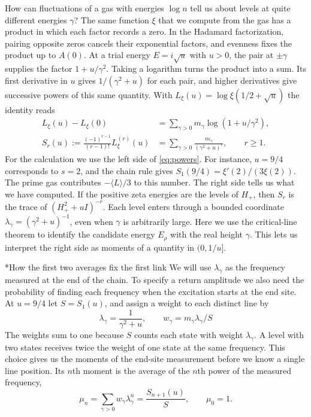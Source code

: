 \documentclass[11pt,letterpaper]{article}
\makeatletter
\renewcommand\subsection{\@startsection{subsection}{2}{\z@}{-2.0ex plus -.3ex}{.75ex}{\normalfont\normalsize\itshape}}
\numberwithin{equation}{section}
\makeatother
\begin{document}
How can fluctuations of a gas with energies $\log n$ tell us about levels at quite different energies $\gamma$? The same function $\xi$ that we compute from the gas has a product in which each factor records a zero. In the Hadamard factorization, pairing opposite zeros cancels their exponential factors, and evenness fixes the product up to $A(0)$. At a trial energy $E=i\sqrt u$ with $u>0$, the pair at $\pm\gamma$ supplies the factor $1+u/\gamma^2$. Taking a logarithm turns the product into a sum. Its first derivative in $u$ gives $1/(\gamma^2+u)$ for each pair, and higher derivatives give successive powers of this same quantity. With $L_\xi(u)=\log\xi(1/2+\sqrt u)$ the identity reads
\begin{equation}
 \begin{aligned}
 L_\xi(u)-L_\xi(0)&=\sum_{\gamma>0}m_\gamma\log(1+u/\gamma^2),\\
 S_r(u):=\frac{(-1)^{r-1}}{(r-1)!}L_\xi^{(r)}(u)
      &=\sum_{\gamma>0}\frac{m_\gamma}{(\gamma^2+u)^r},
      \qquad r\ge1 .
 \end{aligned}
 \label{eq:powers}
\end{equation}
For the calculation we use the left side of \eqref{eq:powers}. For instance, $u=9/4$ corresponds to $s=2$, and the chain rule gives $S_1(9/4)=\xi'(2)/(3\xi(2))$. The prime gas contributes $-\langle L\rangle/3$ to this number. The right side tells us what we have computed. If the positive zeta energies are the levels of $H_+$, then $S_r$ is the trace of $(H_+^2+uI)^{-r}$. Each level enters through a bounded coordinate $\lambda_\gamma=(\gamma^2+u)^{-1}$, even when $\gamma$ is arbitrarily large. Here we use the critical-line theorem to identify the candidate energy $E_\rho$ with the real height $\gamma$. This lets us interpret the right side as moments of a quantity in $(0,1/u]$.

\subsection*{How the first two averages fix the first link}
We will use $\lambda_\gamma$ as the frequency measured at the end of the chain. To specify a return amplitude we also need the probability of finding each frequency when the excitation starts at the end site. At $u=9/4$ let $S=S_1(u)$, and assign a weight to each distinct line by
\[
   \lambda_\gamma=\frac1{\gamma^2+u},\qquad
   w_\gamma=m_\gamma\lambda_\gamma/S
\]
The weights sum to one because $S$ counts each state with weight $\lambda_\gamma$. A level with two states receives twice the weight of one state at the same frequency. This choice gives us the moments of the end-site measurement before we know a single line position. Its $n$th moment is the average of the $n$th power of the measured frequency,
\begin{equation}
 \mu_n=\sum_{\gamma>0}w_\gamma\lambda_\gamma^n
       =\frac{S_{n+1}(u)}{S},\qquad \mu_0=1 .
 \label{eq:mom}
\end{equation}
\end{document}
